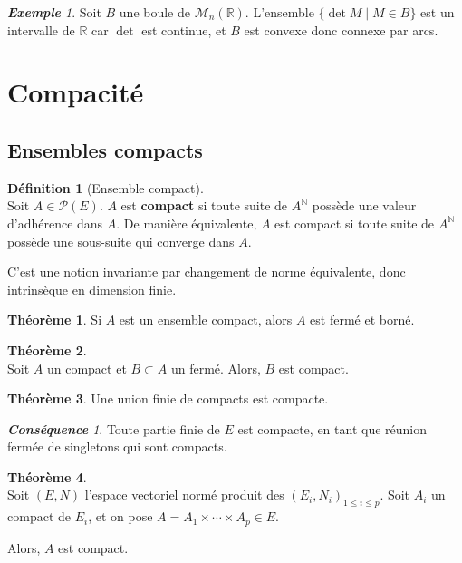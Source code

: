 \documentclass[12pt]{book}
\let\ensembleNombre\mathbb
\newcommand*\N{\ensuremath{\ensembleNombre{N}}}
\newcommand*\R{\ensuremath{\ensembleNombre{R}}}
\theoremstyle{definition}
\newtheorem*{defi}{Définition}
\newtheorem{thme}{Théorème}[chapter]
\theoremstyle{remark}
\newtheorem*{cons}{\textbf{Conséquence}}
\newtheorem*{ex}{\textbf{Exemple}}
\newenvironment{fdef}
  {\begin{mdframed}[roundcorner=10pt, linewidth=1pt]\begin{defi}}
  {\end{defi}\end{mdframed}}
\newenvironment{fthme}
  {\begin{mdframed}[roundcorner=10pt, linewidth=2pt]\begin{thme}}
  {\end{thme}\end{mdframed}}
\begin{document}
	\begin{ex}
	Soit $B$ une boule de $\mathcal M_n(\R)$. L'ensemble $\lbrace \det M \;|\; M \in B \rbrace$ est un intervalle de $\R$ car $\det$ est continue, et $B$ est convexe donc connexe par arcs.
	\end{ex} \newpage
	
	\section{Compacité}
		\subsection{Ensembles compacts}
	\begin{fdef}[Ensemble compact]\mbox{~}\\
	Soit $A \in \mathcal P(E)$. $A$ est \textbf{compact} si toute suite de $A^\N$ possède une valeur d'adhérence dans $A$. De manière équivalente, $A$ est compact si toute suite de $A^\N$ possède une sous-suite qui converge dans $A$.
	\end{fdef}
	
	C'est une notion invariante par changement de norme équivalente, donc intrinsèque en dimension finie.
	
	\begin{fthme}
	Si $A$ est un ensemble compact, alors $A$ est fermé et borné.
	\end{fthme}
	
	\begin{fthme}\mbox{~}\\
	Soit $A$ un compact et $B \subset A$ un fermé. Alors, $B$ est compact.
	\end{fthme}
	
	\begin{fthme}
	Une union finie de compacts est compacte.
	\end{fthme}
	
	\begin{cons}
	Toute partie finie de $E$ est compacte, en tant que réunion fermée de singletons qui sont compacts.
	\end{cons}
	
	\begin{fthme}\mbox{~}\\
	Soit $(E,N)$ l'espace vectoriel normé produit des $(E_i, N_i)_{1 \leq i \leq p}$. Soit $A_i$ un compact de $E_i$, et on pose $A = A_1 \times \cdots \times A_p \in E$.
	
	\noindent Alors, $A$ est compact.
	\end{fthme}
	
\end{document}
